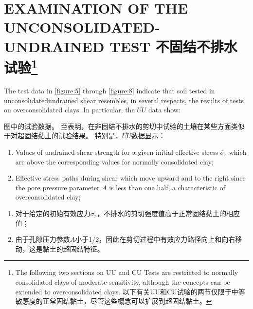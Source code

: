 \section{EXAMINATION OF THE UNCONSOLIDATED-UNDRAINED TEST 不固结不排水试验\protect\footnote[6]{
    The following two sections on UU and CU Tests are restricted to normally consolidated clays of moderate sensitivity, although the concepts can be extended to overconsolidated clays. 以下有关UU和CU试验的两节仅限于中等敏感度的正常固结黏土，尽管这些概念可以扩展到超固结黏土。
}}

\begin{paracol}{2}
    
    The test data in \autoref{figure:5} through \autoref{figure:8} indicate that soil tested in unconsolidatedundrained shear resembles, in several respects, the results of tests on overconsolidated clays. In particular, the $\overline{UU}$ data show: 

    \switchcolumn

    图中的试验数据。 至表明，在非固结不排水的剪切中试验的土壤在某些方面类似于对超固结黏土的试验结果。 特别是，$\overline{UU}$数据显示：

    \switchcolumn*

    \begin{enumerate}
        \item Values of undrained shear strength for a given initial effective stress $\overline{\sigma}_r$ which are above the corresponding values for normally consolidated clay; 
        \item Effective stress paths during shear which move upward and to the right since the pore pressure parameter $A$ is less than one half, a characteristic of overconsolidated clay;
    \end{enumerate}

    \switchcolumn
    
    \begin{enumerate}
        \item 对于给定的初始有效应力$\overline{\sigma}_r$，不排水的剪切强度值高于正常固结黏土的相应值； 
        \item 由于孔隙压力参数$A$小于1/2，因此在剪切过程中有效应力路径向上和向右移动，这是黏土的超固结特征。 
    \end{enumerate}

    \switchcolumn*
    

\end{paracol}
